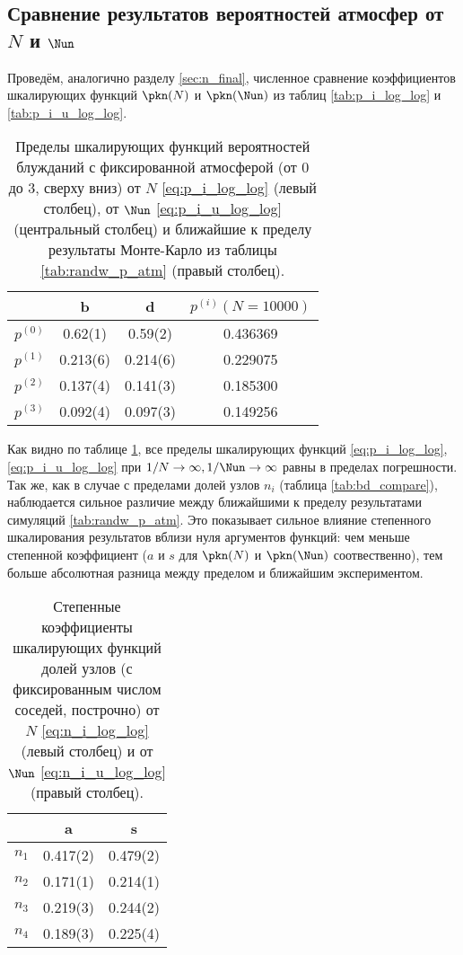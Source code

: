 \subsection{Сравнение результатов вероятностей атмосфер от $N$ и $\Nun$}

Проведём, аналогично разделу \ref{sec:n_final}, численное сравнение коэффициентов шкалирующих функций $\pkn(N)$ и $\pkn(\Nun)$ из таблиц \ref{tab:p_i_log_log} и \ref{tab:p_i_u_log_log}.

\begin{table}[h]
\centering
\begin{tabular}{|c|c|c|c|}
\hline
 & b & d & $p^{(i)}(N=10000)$ \\ \hline
$p^{(0)}$ &  0.62(1) & 0.59(2) &  0.436369\\ \hline
$p^{(1)}$ & 0.213(6) & 0.214(6) & 0.229075\\ \hline
$p^{(2)}$ & 0.137(4) & 0.141(3) & 0.185300\\ \hline
$p^{(3)}$ & 0.092(4) & 0.097(3) & 0.149256\\ \hline
\end{tabular}
\caption{Пределы шкалирующих функций вероятностей блужданий с фиксированной атмосферой (от 0 до 3, сверху вниз) от $N$ \eqref{eq:p_i_log_log} (левый столбец), от $\Nun$ \eqref{eq:p_i_u_log_log} (центральный столбец) и ближайшие к пределу результаты Монте-Карло из таблицы \ref{tab:randw_p_atm} (правый столбец).}
\label{tab:bd_atm_compare}
\end{table}

Как видно по таблице \ref{tab:bd_atm_compare}, все пределы шкалирующих функций \eqref{eq:p_i_log_log}, \eqref{eq:p_i_u_log_log} при $1/N \to \infty, 1/\Nun \to \infty$ равны в пределах погрешности.
Так же, как в случае с пределами долей узлов $n_i$ (таблица \ref{tab:bd_compare}), наблюдается сильное различие между ближайшими к пределу результатами симуляций \ref{tab:randw_p_atm}.
Это показывает сильное влияние степенного шкалирования результатов вблизи нуля аргументов функций: чем меньше степенной коэффициент ($a$ и $s$ для $\pkn(N)$ и $\pkn(\Nun)$ соотвественно), тем больше абсолютная разница между пределом и ближайшим экспериментом.

\begin{table}[h]
\centering
\begin{tabular}{|c|c|c|}
\hline
 & a & s \\ \hline
$n_1$ & 0.417(2) & 0.479(2) \\ \hline
$n_2$ & 0.171(1) & 0.214(1) \\ \hline
$n_3$ & 0.219(3) & 0.244(2) \\ \hline
$n_4$ & 0.189(3) & 0.225(4) \\ \hline
\end{tabular}
\caption{Степенные коэффициенты шкалирующих функций долей узлов (с фиксированным числом соседей, построчно) от $N$ \eqref{eq:n_i_log_log} (левый столбец) и от $\Nun$ \eqref{eq:n_i_u_log_log} (правый столбец).}
\label{tab:as_atm_compare}
\end{table}

